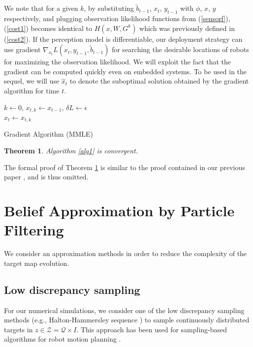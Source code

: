 \documentclass[journal]{IEEEtran}
\newtheorem{theorem}{Theorem}[section]
\begin{document}
We note that for a given $k$, by substituting $\widetilde{b}_{t-1}$, $x_t$, $y_{t-1}$ with $\phi$, $x$, $y$ respectively, and plugging observation likelihood functions from (\ref{sensorf}), (\ref{cost1}) becomes identical to $H(x,W,G^k)$ which was previously defined in (\ref{cost2}).
If the perception model is differentiable, our deployment strategy can use gradient
$
\nabla_{x_t} L(x_t,y_{t-1},\widetilde{b}_{t-1})
$
for searching the desirable locations of robots for maximizing the observation likelihood.  We will exploit the fact that the gradient can be computed quickly even on embedded systems. 
To be used in the sequel, we will use $\hat{x}_t$ to denote the suboptimal solution obtained by the gradient algorithm for time $t$.



{\tiny{
		\begin{algorithm}
			\DontPrintSemicolon
			$k \gets 0$, $x_{t,k} \gets x_{t-1}$, $\delta{L} \gets \epsilon$\\
\Return $\hat{x}_t \gets x_{t,k}$
			\caption{Gradient Algorithm (MMLE)}\label{alg1}
		\end{algorithm}
}}


\begin{theorem}
	Algorithm \ref{alg1} is convergent.
	\label{thm1}
\end{theorem}
The formal proof of Theorem \ref{thm1} is similar to the proof
contained in our previous paper \cite{park2014robust}, and is thus omitted.

\section{Belief Approximation by Particle Filtering}
\label{sec:sec6}
We consider an approximation methods in order to reduce the complexity of the target map evolution. 
\subsection{Low discrepancy sampling} 
For our numerical simulations, we consider one of the low discrepancy sampling methods (e.g., Halton-Hammersley sequence \cite{beardwood1959shortest}) to sample continuously distributed targets in $z \in \mathcal{Z} = \mathcal{Q} \times {I}$. This approach has been used for sampling-based algorithms for robot motion planning \cite{lavalle2006planning}.
\end{document}
